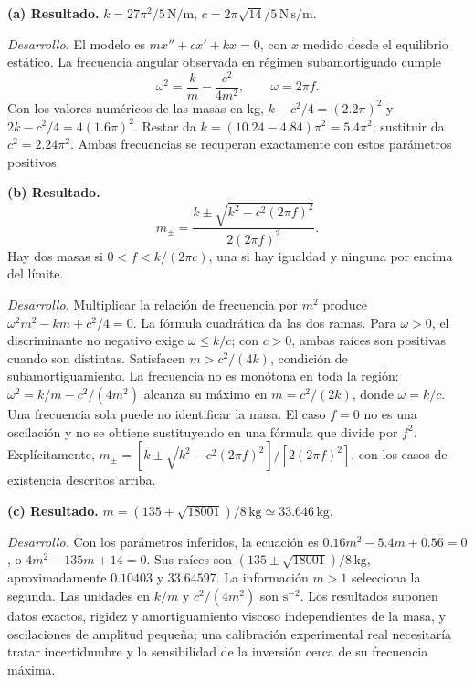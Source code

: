 \noindent\textbf{(a) Resultado.} \(k=27\pi^2/5\,\mathrm{N/m}\), \(c=2\pi\sqrt{14}/5\,\mathrm{N\,s/m}\).

\noindent\textit{Desarrollo.} El modelo es \(mx''+cx'+kx=0\), con \(x\) medido desde el equilibrio estático. La frecuencia angular observada en régimen subamortiguado cumple
\[\omega^2=\frac{k}{m}-\frac{c^2}{4m^2},\qquad\omega=2\pi f.\]
Con los valores numéricos de las masas en kg, \(k-c^2/4=(2.2\pi)^2\) y \(2k-c^2/4=4(1.6\pi)^2\). Restar da \(k=(10.24-4.84)\pi^2=5.4\pi^2\); sustituir da \(c^2=2.24\pi^2\). Ambas frecuencias se recuperan exactamente con estos parámetros positivos.

\medskip

\noindent\textbf{(b) Resultado.} \[m_\pm=\frac{k\pm\sqrt{k^2-c^2(2\pi f)^2}}{2(2\pi f)^2}.\]
Hay dos masas si \(0<f<k/(2\pi c)\), una si hay igualdad y ninguna por encima del límite.

\noindent\textit{Desarrollo.} Multiplicar la relación de frecuencia por \(m^2\) produce \(\omega^2m^2-km+c^2/4=0\). La fórmula cuadrática da las dos ramas. Para \(\omega>0\), el discriminante no negativo exige \(\omega\le k/c\); con \(c>0\), ambas raíces son positivas cuando son distintas. Satisfacen \(m>c^2/(4k)\), condición de subamortiguamiento.
La frecuencia no es monótona en toda la región: \(\omega^2=k/m-c^2/(4m^2)\) alcanza su máximo en \(m=c^2/(2k)\), donde \(\omega=k/c\). Una frecuencia sola puede no identificar la masa. El caso \(f=0\) no es una oscilación y no se obtiene sustituyendo en una fórmula que divide por \(f^2\).
Explícitamente, \(m_\pm=[k\pm\sqrt{k^2-c^2(2\pi f)^2}]/[2(2\pi f)^2]\), con los casos de existencia descritos arriba.

\medskip

\noindent\textbf{(c) Resultado.} \(m=(135+\sqrt{18001})/8\,\mathrm{kg}\simeq33.646\,\mathrm{kg}\).

\noindent\textit{Desarrollo.} Con los parámetros inferidos, la ecuación es \(0.16m^2-5.4m+0.56=0\), o \(4m^2-135m+14=0\). Sus raíces son \((135\pm\sqrt{18001})/8\,\mathrm{kg}\), aproximadamente \(0.10403\) y \(33.64597\). La información \(m>1\) selecciona la segunda.
Las unidades en \(k/m\) y \(c^2/(4m^2)\) son \(\mathrm{s^{-2}}\). Los resultados suponen datos exactos, rigidez y amortiguamiento viscoso independientes de la masa, y oscilaciones de amplitud pequeña; una calibración experimental real necesitaría tratar incertidumbre y la sensibilidad de la inversión cerca de su frecuencia máxima.
